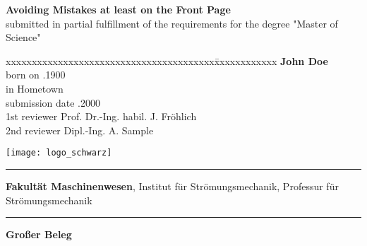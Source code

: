 \begin{titlepage}
\vspace{1.5cm}
%
\textbf{\LARGE Avoiding Mistakes at least on the Front Page}\\[2.0cm]
%
\normalsize
submitted in partial fulfillment of the requirements for the degree "Master of Science"\\[2.5cm]
\normalsize
\begin{tabbing}
xxxxxxxxxxxxxxxxxxxxxxxxxxxxxxxxxxxxxxxx\=xxxxxxxxxxxx\kill
        							\>	\textbf{John Doe}									\\
born on						.1900											\\
in										\>	Hometown															\\[0.1cm]
submission date				.2000													\\[0.5cm]
1st reviewer					\>  Prof. Dr.-Ing. habil. J. Fr\"ohlich			\\
2nd reviewer					\>	Dipl.-Ing. A. Sample											\\
\end{tabbing}
\cleardoublepage

%
%
\hspace{-2.1cm} \texttt{[image: logo\_schwarz]}
\vspace{0.5cm}
\hrule 
\vspace{0.05cm}
\small\textbf{Fakult\"at Maschinenwesen},
Institut f\"ur Str\"omungsmechanik,
Professur f\"ur Str\"omungsmechanik
\vspace{0.1cm}
\hrule 
\vspace{4cm}
\textbf{\Large Großer Beleg}\\



\end{titlepage}
